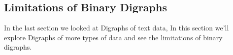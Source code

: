 \documentclass[12pt,a4paper]{article}
\begin{document}
\pagebreak
\begin{samepage}
\subsection{Limitations of Binary Digraphs}
In the last section we looked at Digraphs of text data, In this section we'll explore Digraphs of more types of data and see the limitations of binary digraphs. 
\begin{figure}[!h]
    \centering
\end{figure}
\end{samepage}
\end{document}
